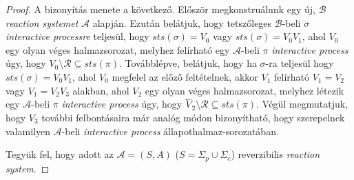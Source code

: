 \documentclass[12pt]{article}
\theoremstyle{definition}
\theoremstyle{remark}
\theoremstyle{plain}
\theoremstyle{plain}
\newcommand{\backwardhat}{\overset{\leftharpoonup}}
\begin{document}
    \begin{proof}
        A bizonyítás menete a következő. Először megkonstruálunk egy új, $\mathscr{B}$ \textit{reaction systemet} $\mathscr{A}$ alapján. Ezután belátjuk, hogy tetszőleges $\mathscr{B}$-beli $\sigma$ \textit{interactive processre} teljesül, hogy $\textit{sts}(\sigma)=V_{0}$ vagy $\textit{sts}(\sigma)=V_{0}V_{1}$, ahol $V_{0}$ egy olyan véges halmazsorozat, melyhez felírható egy $\mathscr{A}$-beli $\pi$ \textit{interactive process} úgy, hogy $V_{0} \setminus \mathcal{R} \subseteq \textit{sts}(\pi)$. Továbblépve, belátjuk, hogy ha $\sigma$-ra teljesül hogy $\textit{sts}(\sigma)=V_{0}V_{1}$, ahol $V_{0}$ megfelel az előző feltételnek, akkor $V_{1}$ felírható $V_{1}=V_{2}$ vagy $V_{1}=V_{2}V_{3}$ alakban, ahol $V_{2}$ egy olyan véges halmazsorozat, melyhez létezik egy $\mathscr{A}$-beli $\pi$ \textit{interactive process} úgy, hogy $\backwardhat V_{2} \setminus \mathcal{R} \subseteq \textit{sts}(\pi)$. Végül megmutatjuk, hogy $V_{3}$ további felbontásaira már analóg módon bizonyítható, hogy szerepelnek valamilyen $\mathscr{A}$-beli \textit{interactive process} állapothalmaz-sorozatában.

        Tegyük fel, hogy adott az $\mathscr{A} = (S, A)$ ($S = \Sigma_{p} \cup \Sigma_{c}$) reverzibilis \textit{reaction system}.
        

\end{proof}
\end{document}
